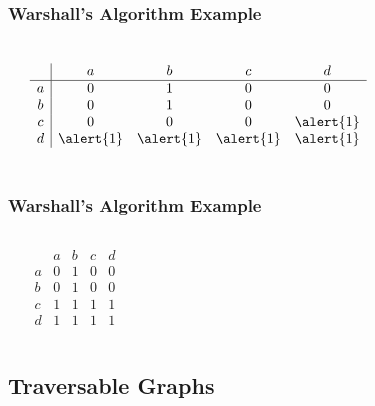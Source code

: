 \documentclass[dvipsnames]{beamer}
\begin{document}
\begin{frame}
  \frametitle{Warshall's Algorithm Example}

  \begin{example}
    \begin{columns}
      \begin{center}
      \end{center}

      \[
        \begin{array}{c|cccc}
              & a & b & c & d\\\hline
            a & 0 & 1 & 0 & 0\\
            b & 0 & 1 & 0 & 0\\
            c & 0 & 0 & 0 & \alert{1}\\
            d & \alert{1} & \alert{1} & \alert{1} & \alert{1}
        \end{array}
      \]
    \end{columns}
  \end{example}
\end{frame}

\begin{frame}
  \frametitle{Warshall's Algorithm Example}

  \begin{example}
    \begin{columns}
      \begin{center}
      \end{center}

      \[
        \begin{array}{c|cccc}
              & a & b & c & d\\\hline
            a & 0 & 1 & 0 & 0\\
            b & 0 & 1 & 0 & 0\\
            c & 1 & 1 & 1 & 1\\
            d & 1 & 1 & 1 & 1
        \end{array}
      \]
    \end{columns}
  \end{example}
\end{frame}

\subsection{Traversable Graphs}
\end{document}
